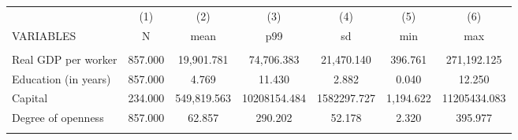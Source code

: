 \documentclass[]{article}
\begin{document}
\begin{tabular}{lcccccc} \hline
 & (1) & (2) & (3) & (4) & (5) & (6) \\
VARIABLES & N & mean & p99 & sd & min & max \\ \hline
 &  &  &  &  &  &  \\
Real GDP per worker & 857.000 & 19,901.781 & 74,706.383 & 21,470.140 & 396.761 & 271,192.125 \\
Education (in years) & 857.000 & 4.769 & 11.430 & 2.882 & 0.040 & 12.250 \\
Capital & 234.000 & 549,819.563 & 10208154.484 & 1582297.727 & 1,194.622 & 11205434.083 \\
Degree of openness & 857.000 & 62.857 & 290.202 & 52.178 & 2.320 & 395.977 \\
 &  &  &  &  &  &  \\ \hline
\end{tabular}
\end{document}
